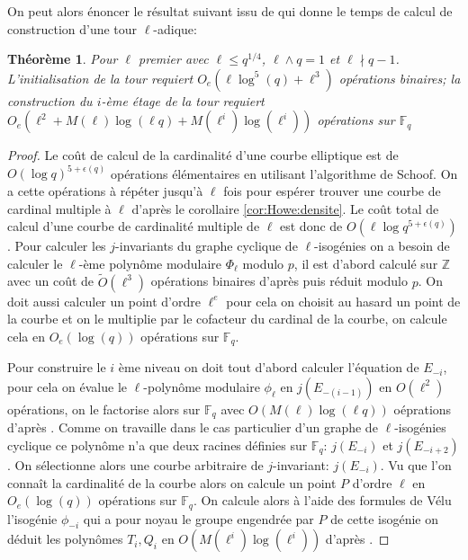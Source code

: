 \documentclass[10pt,a4paper]{book}
\theoremstyle{plain}
\newtheorem{thm}{Théorème}[chapter]
\theoremstyle{definition}
\theoremstyle{definition}
\theoremstyle{definition}
\theoremstyle{definition}
\theoremstyle{remark}
\theoremstyle{remark}
\theoremstyle{definition}
\begin{document}
On peut alors énoncer le résultat suivant issu de \cite{DeFeo-Doliskani-Schost13} qui donne le temps de calcul de construction d'une tour $\ell$-adique:

\begin{thm}
Pour $\ell$ premier avec $\ell \leqslant q^{1/4}$, $\ell \wedge q = 1$ et $\ell \nmid q-1$. L'initialisation de la tour requiert $O_e(\ell \log^5(q)+\ell^3)$ opérations binaires; la construction du $i$-ème étage de la tour requiert $O_e(\ell^2+M(\ell)\log(\ell q)+M(\ell^i)\log(\ell^i))$ opérations sur $\mathbb{F}_q$
\end{thm} 

\begin{proof}
Le coût de calcul de la cardinalité d'une courbe elliptique est de $O(\log q)^{5+\epsilon(q)}$ opérations élémentaires en utilisant l'algorithme de Schoof. On a cette opérations à répéter jusqu'à $\ell$ fois pour espérer trouver une courbe de cardinal multiple à $\ell$ d'après le corollaire \ref{cor:Howe:densite}. Le coût total de calcul d'une courbe de cardinalité multiple de $\ell$ est donc de  $O(\ell\log q^{5+\epsilon(q)})$. Pour calculer les $j$-invariants du graphe cyclique de $\ell$-isogénies on a besoin de calculer le $\ell$-ème polynôme modulaire $\Phi_{\ell}$ modulo $p$, il est d'abord calculé sur $\mathbb{Z}$ avec un coût de $\tilde{O}(\ell^3)$ opérations binaires d'après \cite{enge2008} puis réduit modulo $p$. On doit aussi calculer un point d'ordre $\ell^e$ pour cela on choisit au hasard un point de la courbe et on le multiplie par le cofacteur du cardinal de la courbe, on calcule cela en $O_{e}(\log(q))$ opérations sur $\mathbb{F}_q$.

Pour construire le $i$ ème niveau on doit tout d'abord calculer l'équation de $E_{-i}$, pour cela on évalue le $\ell$-polynôme modulaire $\phi_{\ell}$ en $j(E_{-(i-1)})$ en $O(\ell^2)$ opérations, on le factorise alors sur $\mathbb{F}_q$ avec $O(M(\ell)\log(\ell q))$ oéprations d'après \cite[Ch.14]{vzGJG03}. Comme on travaille dans le cas particulier d'un graphe de $\ell$-isogénies cyclique ce polynôme n'a que deux racines définies sur $\mathbb{F}_q$: $j(E_{-i})$ et $j(E_{-i+2})$. On sélectionne alors une courbe arbitraire de $j$-invariant: $j(E_{-i})$. Vu que l'on connaît la cardinalité de la courbe alors on calcule un point $P$ d'ordre $\ell$ en $O_{e}(\log(q))$ opérations sur $\mathbb{F}_q$. On calcule alors à l'aide des formules de Vélu l'isogénie $\phi_{-i}$ qui a pour noyau le groupe engendrée par $P$ de cette isogénie on déduit les polynômes $T_{i},Q_{i}$ en $O(M(\ell^i)\log(\ell^i))$ d'après \cite[Algorithme 1]{DeFeo-Doliskani-Schost13}.
\end{proof}
\end{document}
